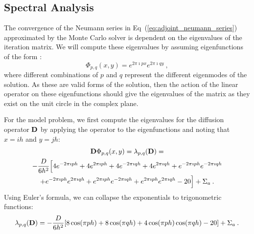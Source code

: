 \subsection{Spectral Analysis}
\label{subsec:spectral_analysis}
The convergence of the Neumann series in
Eq~(\ref{eq:adjoint_neumann_series}) approximated by the Monte Carlo
solver is dependent on the eigenvalues of the iteration matrix. We
will compute these eigenvalues by assuming eigenfunctions of the form
\citep{leveque_finite_2007}:
\begin{equation}
  \Phi_{p,q}(x,y) = e^{2 \pi \imath p x} e^{2 \pi \imath q y}\:,
  \label{eq:eigenfunction_form}
\end{equation}
where different combinations of $p$ and $q$ represent the different
eigenmodes of the solution. As these are valid forms of the solution,
then the action of the linear operator on these eigenfunctions should
give the eigenvalues of the matrix as they exist on the unit circle in
the complex plane.

For the model problem, we first compute the eigenvalues for the
diffusion operator $\mathbf{D}$ by applying the operator to the
eigenfunctions and noting that $x=ih$ and $y=jh$:
\begin{multline}
  \mathbf{D}\Phi_{p,q}(x,y) = \lambda_{p,q}(\mathbf{D})
  =\\ -\frac{D}{6h^2}\Big[4 e^{-2 \pi \imath p h} + 4 e^{2 \pi \imath
      p h} + 4 e^{-2 \pi \imath q h} + 4 e^{2 \pi \imath q h} + e^{-2
      \pi \imath p h} e^{-2 \pi \imath q h} \\ + e^{-2 \pi \imath p h}
    e^{2 \pi \imath q h} + e^{2 \pi \imath p h} e^{-2 \pi \imath q h}
    + e^{2 \pi \imath p h} e^{2 \pi \imath q h} - 20\Big] + \Sigma_a
  \:.
  \label{eq:deriv_diff_1}
\end{multline}
Using Euler's formula, we can collapse the exponentials to
trigonometric functions:
\begin{equation}
  \lambda_{p,q}(\mathbf{D}) = -\frac{D}{6h^2}[ 8 \cos(\pi p h) + 8
    \cos(\pi q h) + 4 \cos(\pi p h) \cos(\pi q h) - 20] + \Sigma_a\:.
  \label{eq:deriv_diff_2}
\end{equation}

